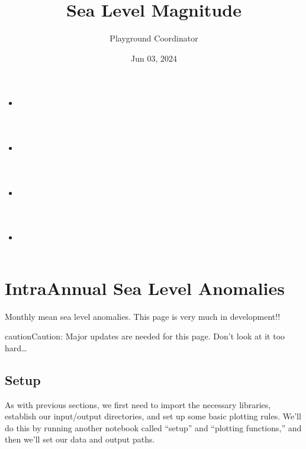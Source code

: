 \documentclass[letterpaper,10pt,english]{jupyterBook}
\title{Sea Level Magnitude}
\date{Jun 03, 2024}
\author{Playground Coordinator}
\begin{document}
\pagestyle{empty}
\sphinxmaketitle
\pagestyle{plain}
\sphinxtableofcontents
\pagestyle{normal}
\label{\detokenize{notebooks/SL_intra-annual::doc}}

\begin{itemize}
\item {} 
\sphinxAtStartPar
{\hyperref[\detokenize{notebooks/regional_and_local/SL_anomaly_intra-annual::doc}]{}}

\item {} 
\sphinxAtStartPar
{\hyperref[\detokenize{notebooks/regional_and_local/SL_Rankings_intra-annual::doc}]{}}

\item {} 
\sphinxAtStartPar
{\hyperref[\detokenize{notebooks/regional_and_local/SL_Extremes_intra-annual::doc}]{}}

\item {} 
\sphinxAtStartPar
{\hyperref[\detokenize{notebooks/regional_and_local/SL_Components_intra-annual::doc}]{}}

\end{itemize}

\sphinxstepscope


\part{Intra\sphinxhyphen{}Annual Sea Level Anomalies}
\label{\detokenize{notebooks/regional_and_local/SL_anomaly_intra-annual:intra-annual-sea-level-anomalies}}\label{\detokenize{notebooks/regional_and_local/SL_anomaly_intra-annual::doc}}
\sphinxAtStartPar
Monthly mean sea level anomalies. This page is very much in development!!

\begin{sphinxadmonition}{caution}{Caution:}
\sphinxAtStartPar
Major updates are needed for this page. Don’t look at it too hard…
\end{sphinxadmonition}


\chapter{Setup}
\label{\detokenize{notebooks/regional_and_local/SL_anomaly_intra-annual:setup}}
\sphinxAtStartPar
As with previous sections, we first need to import the necessary libraries, establish our input/output directories, and set up some basic plotting rules. We’ll do this by running another notebook called “setup” and “plotting functions,” and then we’ll set our data and output paths.
\end{document}
